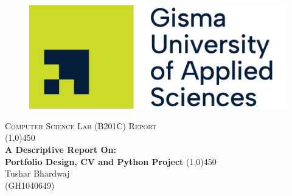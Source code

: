 \begin{titlepage}
    
    \begin{center}
        \begin{figure}
            \centering
            \vspace{0.75in}
            \includegraphics[width=0.75\linewidth]{logo.png}
            \vspace{1in}
        \end{figure}

        \textsc{ \Large { Computer Science Lab (B201C) Report}}\\
        [0.75in]
        \line(1,0){450}\\
        [3mm]
        \huge{\bf A Descriptive Report On: \\
        Portfolio Design, CV and Python Project}
        \line(1,0){450}\\
        [2cm]

        \large {Tushar Bhardwaj\\ (GH1040649)}
        
    \end{center}
\end{titlepage}